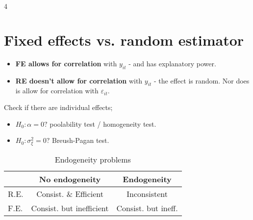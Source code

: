 4
\section{Fixed effects vs. random estimator} %
\begin{itemize}
  \item \textbf{FE allows for correlation} with $y_{it}$ - and has explanatory power.
  \item \textbf{RE doesn't allow for correlation} with $y_{it}$ - the effect is random. Nor does is allow for correlation with $\varepsilon_{it}$.
\end{itemize}
Check if there are individual effects;
\begin{itemize}
  \item $H_0:\alpha=0?$ poolability test / homogeneity test.
  \item $H_0:\sigma_\xi^2=0?$ Breush-Pagan test.
\end{itemize}
\begin{table}[h]
  \centering
  \footnotesize
  \begin{tabular}{l|cc}
    {}    & No endogeneity            & Endogeneity   \\
    \midrule
    R.E.  & Consist. \& Efficient     & Inconsistent  \\
    F.E.  & Consist. but inefficient  & Consist. but ineff.
  \end{tabular}
\caption{Endogeneity problems}
\label{tab:endogeneity}
\end{table}


